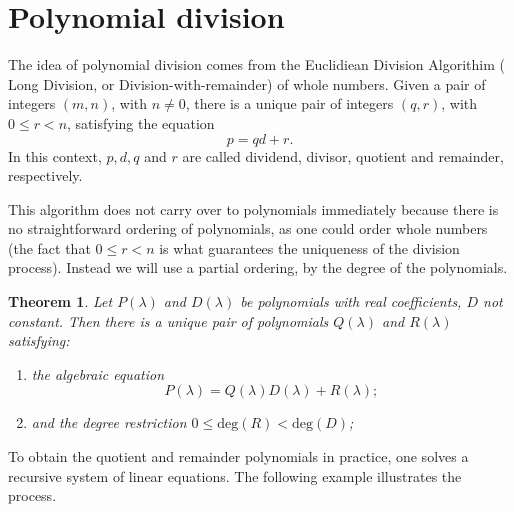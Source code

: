 \documentclass[12pt,oneside]{exam}
\newtheorem{theorem}{Theorem}[section]
\begin{document}
\section{Polynomial division}
The idea of polynomial division comes from the Euclidiean Division Algorithim ( Long Division, or Division-with-remainder) of whole numbers. Given a pair of integers $(m,n)$, with $n \neq 0$, there is a unique pair of integers $(q,r)$, with $0 \leq r < n$, satisfying the equation
\begin{equation}\label{long_division}
p=qd+r.
\end{equation}
In this context, $p,d,q$ and $r$ are called dividend, divisor, quotient and remainder, respectively. 

This algorithm does not carry over to polynomials immediately because there is no straightforward ordering of polynomials, as one could order whole numbers (the fact that $0 \leq r < n$ is what guarantees the uniqueness of the division process). Instead we will use a partial ordering, by the degree of the polynomials. 
\begin{theorem}
Let $P(\lambda)$ and $D(\lambda)$ be polynomials with real coefficients, $D$ not constant. Then there is a unique pair of polynomials $Q(\lambda)$ and $R(\lambda)$ satisfying:
\begin{enumerate}
\item[i.] the algebraic equation 
\begin{equation}\label{polynomial_long_division}
P(\lambda)=Q(\lambda)D(\lambda)+R(\lambda);
\end{equation}
\item[ii.] and the degree restriction $0 \leq \textrm{deg}(R) < \textrm{deg}(D)$; 
\end{enumerate}
\end{theorem}

To obtain the quotient and remainder polynomials in practice, one solves a recursive system of linear equations. The following example illustrates the process. 
\end{document}
